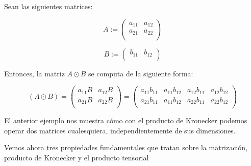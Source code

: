 \begin{ejemplo}

Sean las siguientes matrices:

    \begin{equation}
        A := \begin{pmatrix}
            a_{11} & a_{12} \\
            a_{21} & a_{22} \\
        \end{pmatrix}
    \end{equation}

    \begin{equation}
        B := \begin{pmatrix}
            b_{11} & b_{12} \\
        \end{pmatrix}
    \end{equation}

    Entonces, la matriz $A \odot B$ se computa de la siguiente forma:

    \begin{equation}
        (A \odot B) = \begin{pmatrix}
            a_{11}B & a_{12}B \\
            a_{21}B & a_{22}B \\
        \end{pmatrix} =
        \begin{pmatrix}
            a_{11} b_{11} & a_{11} b_{12} & a_{12} b_{11} & a_{12} b_{12} \\
            a_{21} b_{11} & a_{11} b_{12} & a_{22} b_{11} & a_{22} b_{12} \\
        \end{pmatrix}
    \end{equation}

\end{ejemplo}

\begin{observacion}
    El anterior ejemplo nos muestra cómo con el producto de Kronecker podemos operar dos matrices cualesquiera, independientemente de sus dimensiones.
\end{observacion}

Vemos ahora tres propiedades fundamentales que tratan sobre la matrización, producto de Kronecker y el producto tensorial

